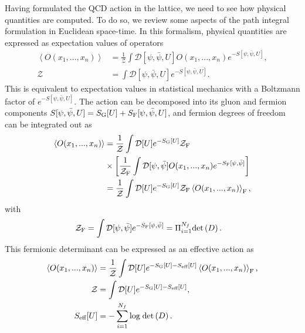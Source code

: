 Having formulated the QCD action in the lattice, we need to see how physical quantities are computed. To do so, we review some aspects of the path integral formulation in Euclidean space-time. In this formalism, physical quantities are expressed as expectation values of operators
\begin{align}
\left<{O}(x_1,...,x_n)\right>&=\frac{1}{\mathcal{Z}}\int\mathcal{D}[\psi,\bar{\psi},U]{O}(x_1,...,x_n)e^{-S[\psi,\bar{\psi},U]}, \\
\mathcal{Z}&=\int\mathcal{D}[\psi,\bar{\psi},U]e^{-S[\psi,\bar{\psi},U]}.
\end{align}
This is equivalent to expectation values in statistical mechanics with a Boltzmann factor of $e^{-S[\psi,\bar{\psi},U]}$. The action can be decomposed into its gluon and fermion components $S[\psi,\bar{\psi},U]=S_{\textrm G}[U]+S_{\textrm F}[\psi,\bar{\psi},U]$, and fermion degrees of freedom can be integrated out as
\begin{align}
\left<{O}(x_1,...,x_n)\right>&=\frac{1}{\mathcal{Z}}\int\mathcal{D}[U]e^{-S_{\textrm G}[U]}\mathcal{Z}_{\textrm F}\notag \\
&\times\left[\frac{1}{\mathcal{Z}_{\textrm F}}\int\mathcal{D}[\psi,\bar{\psi}]{O}(x_1,...,x_n)e^{-S_{\textrm F}[\psi,\bar{\psi}]}\right] \\
&=\frac{1}{\mathcal{Z}}\int\mathcal{D}[U]e^{-S_{\textrm G}[U]}\mathcal{Z}_{\textrm F}\left<{O}(x_1,...,x_n)\right>_{\textrm F},
\end{align}
with 
\begin{align}
\mathcal{Z}_{\textrm F}&=\int\mathcal{D}[\psi,\bar{\psi}]e^{-S_{\textrm F}[\psi,\bar{\psi}]}=\Pi_{i=1}^{N_f}{\textrm{det}}\left(D\right).
\end{align}
This fermionic determinant can be expressed as an effective action as
\begin{align}
\left<{O}(x_1,...,x_n)\right>&=\frac{1}{\mathcal{Z}}\int\mathcal{D}[U]e^{-S_{\textrm G}[U]-S_{\textrm{eff}}[U]}\left<{O}(x_1,...,x_n)\right>_{\textrm F}, \\
\mathcal{Z}&=\int\mathcal{D}[U]e^{-S_{\textrm G}[U]-S_{\textrm{eff}}[U]}, \\
S_{\textrm{eff}}[U]&=-\sum_{i=1}^{N_f}{\textrm{log}}\;{\textrm{det}}\left(D\right).
\end{align}

